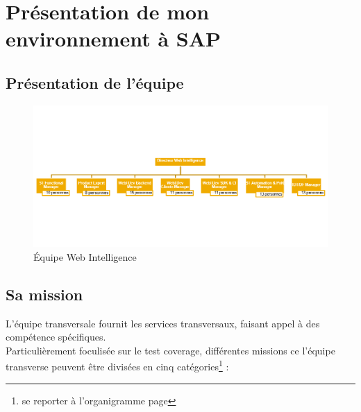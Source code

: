 

\chapter{Pr\'{e}sentation de mon environnement \`{a} SAP}


\section{Présentation de l'équipe}




\begin{figure}[h!]
  \centering
      \includegraphics[width=1.2\textwidth]{images/allRaphaelTeam.png}
  \caption{\'{E}quipe Web Intelligence}
	\label{figure:}
\end{figure}








\section{Sa mission}

L'\'{e}quipe transversale fournit les services transversaux, faisant appel à des compétence spécifiques.\\
Particuli\`{e}rement foculis\'{e}e sur le test coverage, différentes missions ce l'\'{e}quipe transverse peuvent être divisées en cinq catégories\footnote{se reporter à l'organigramme page \pageref{pdf:org}} :\\

